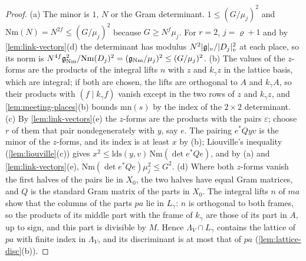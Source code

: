 \begin{proof}
(a) The minor is $1$, $N$ or the Gram determinant. $1\le(G/\mu_j)^2$ and $\mathrm{Nm}(N)=N^{2f}\le(G/\mu_j)^2$ because $G\ge N^f\mu_j$. For $r=2$, $j=\varrho+1$ and by \cref{lem:link-vectors}(d) the determinant has modulus
$N^2\lvert \mathfrak g\rvert_v/\lvert D_j\rvert_v^2$ at each place, so its norm is $N^{4f}\mathfrak g_{\rm Nm}^2/\mathrm{Nm}(D_j)^2=(\mathfrak g_{\rm Nm}/\mu_j)^2\le(G/\mu_j)^2$. (b) The values of the $z$-forms are the products of the integral lifts $n$ with $z$
and $k_\gamma z$ in the lattice basis, which are integral; if both are chosen, the lifts are orthogonal to $A$ and $k_\gamma A$, so their products with $(f\mid k_\gamma f)$ vanish except in the two rows of $z$ and $k_\gamma z$, and
\cref{lem:meeting-places}(b) bounds $\mathrm{mn}(s)$ by the index of the $2\times2$ determinant. (c) By \cref{lem:link-vectors}(e) the $z$-forms are the products with the pairs $\varepsilon$; choose $r$ of them that pair
nondegenerately with $y$, say $e$. The pairing $e^*Qyv$ is the minor of the $z$-forms, and its index is at least $x$ by (b); Liouville's inequality (\cref{lem:liouville}(c)) gives $x^2\le\mathrm{lds}(y,v)\,\mathrm{Nm}(\det e^*Qe)$, and by (a) and
\cref{lem:link-vectors}(e), $\mathrm{Nm}(\det e^*Qe)\mu_j^2\le G^2$. (d) Where both $z$-forms vanish the first halves of the pairs lie in $X_0$, the two halves have equal Gram matrices, and $Q$ is the standard Gram
matrix of the parts in $X_0$. The integral lifts $n$ of $ma$ show that the columns of the parts $pa$ lie in $L_\gamma$: $n$ is orthogonal to both frames, so the products of its middle part with the frame of $k_\gamma$
are those of its part in $A$, up to sign, and this part is divisible by $M$. Hence $\Lambda_V\cap L_\gamma$ contains the lattice of $pa$ with finite index in $\Lambda_V$, and its discriminant is at most that of $pa$
(\cref{lem:lattice-disc}(b)).
\end{proof}

